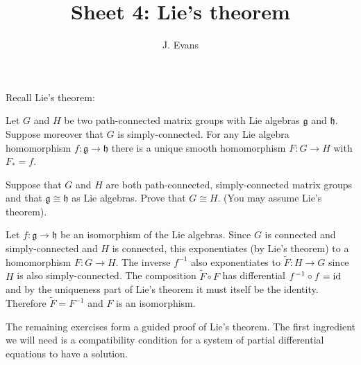 \documentclass[12pt]{article}
\title{Sheet 4: Lie's theorem}
\author{J. Evans}
\date{}
\begin{document}
\maketitle

Recall Lie's theorem:
\begin{thm}[Lie]
Let $G$ and $H$ be two path-connected matrix groups with Lie algebras $\mathfrak{g}$ and $\mathfrak{h}$. Suppose moreover that $G$ is simply-connected. For any Lie algebra homomorphism $f\colon\mathfrak{g}\to\mathfrak{h}$ there is a unique smooth homomorphism $F\colon G\to H$ with $F_*=f$.
\end{thm}

\begin{question}
Suppose that $G$ and $H$ are both path-connected, simply-connected matrix groups and that $\mathfrak{g}\cong\mathfrak{h}$ as Lie algebras. Prove that $G\cong H$. (You may assume Lie's theorem).
\end{question}

\begin{answer}
Let $f\colon\mathfrak{g}\to\mathfrak{h}$ be an isomorphism of the Lie algebras. Since $G$ is connected and simply-connected and $H$ is connected, this exponentiates (by Lie's theorem) to a homomorphism $F\colon G\to H$. The inverse $f^{-1}$ also exponentiates to $\tilde{F}\colon H\to G$ since $H$ is also simply-connected. The composition $\tilde{F}\circ F$ has differential $f^{-1}\circ f=\operatorname{id}$ and by the uniqueness part of Lie's theorem it must itself be the identity. Therefore $\tilde{F}=F^{-1}$ and $F$ is an isomorphism.
\end{answer}


The remaining exercises form a guided proof of Lie's theorem. The first ingredient we will need is a compatibility condition for a system of partial differential equations to have a solution.
\end{document}
